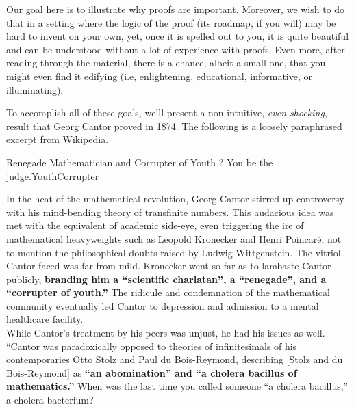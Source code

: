 Our goal here is to illustrate why proofs are important. Moreover, we wish to do that in a setting where the logic of the proof (its roadmap, if you will) may be hard to invent on your own, yet, once it is spelled out to you, it is quite beautiful and can be understood without a lot of experience with proofs. Even more, after reading through the material, there is a chance, albeit a small one, that you might even find it edifying (i.e, enlightening, educational, informative, or illuminating). 

To accomplish all of these goals, we'll present a non-intuitive, \textit{even shocking}, result that \href{https://en.wikipedia.org/wiki/Georg_Cantor}{Georg Cantor} proved in 1874. The following is a loosely paraphrased excerpt from Wikipedia.

\begin{funColor}{Renegade Mathematician and Corrupter of Youth ? You be the judge.}{YouthCorrupter}

In the heat of the mathematical revolution, Georg Cantor stirred up controversy with his mind-bending theory of transfinite numbers. This audacious idea was met with the equivalent of academic side-eye, even triggering the ire of mathematical heavyweights such as Leopold Kronecker and Henri Poincaré, not to mention the philosophical doubts raised by Ludwig Wittgenstein. The vitriol Cantor faced was far from mild. Kronecker went so far as to lambaste Cantor publicly, \textbf{branding him a ``scientific charlatan'', a ``renegade'', and a ``corrupter of youth.''} The ridicule and condemnation of the mathematical community eventually led Cantor to depression and admission to a mental healthcare facility. \\

While Cantor's treatment by his peers was unjust, he had his issues as well. ``Cantor was paradoxically opposed to theories of infinitesimals of his contemporaries Otto Stolz and Paul du Bois-Reymond, describing [Stolz and du Bois-Reymond] as \textbf{``an abomination'' and ``a cholera bacillus of mathematics.''} When was the last time you called someone ``a cholera bacillus,'' a cholera bacterium?
\end{funColor}

